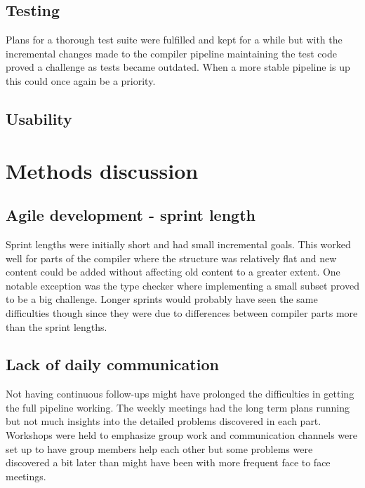 \subsection{Testing}

Plans for a thorough test suite were fulfilled and kept for a while but with the incremental changes made to the compiler pipeline maintaining the test code proved a challenge as tests became outdated. When a more stable pipeline is up this could once again be a priority.

\subsection{Usability}




\section{Methods discussion}

\subsection{Agile development - sprint length}

Sprint lengths were initially short and had small incremental goals. This worked well for parts of the compiler where the structure was relatively flat and new content could be added without affecting old content to a greater extent. One notable exception was the type checker where implementing a small subset proved to be a big challenge. Longer sprints would probably have seen the same difficulties though since they were due to differences between compiler parts more than the sprint lengths.

\subsection{Lack of daily communication}

Not having continuous follow-ups might have prolonged the difficulties in getting the full pipeline working. The weekly meetings had the long term plans running but not much insights into the detailed problems discovered in each part. Workshops were held to emphasize group work and communication channels were set up to have group members help each other but some problems were discovered a bit later than might have been with more frequent face to face meetings.

